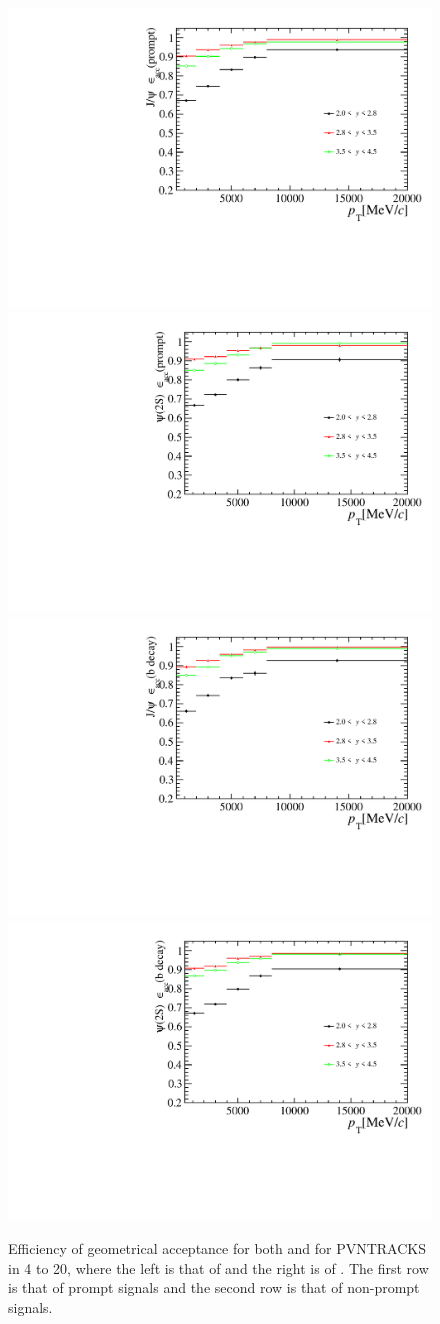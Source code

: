 \begin{figure}[!tbp]
  \begin{center}
    \includegraphics[width=0.49\linewidth]{pdf/Jpsi/eff_acc/eff_prompt_point.pdf}
    \includegraphics[width=0.49\linewidth]{pdf/Psi2S/eff_acc/eff_prompt_point.pdf}
    \vspace*{-0.5cm}
    \includegraphics[width=0.49\linewidth]{pdf/Jpsi/eff_acc/eff_fromb_point.pdf}
    \includegraphics[width=0.49\linewidth]{pdf/Psi2S/eff_acc/eff_fromb_point.pdf}
  \end{center}
  \caption{
    Efficiency of geometrical acceptance for both \jpsi and \psitwos for PVNTRACKS in 4 to 20, where the 
    left is that of \jpsi and the right is of \psitwos. The first row is that of prompt signals and the 
    second row is that of non-prompt signals.}
  \label{EffAcc}
\end{figure}

